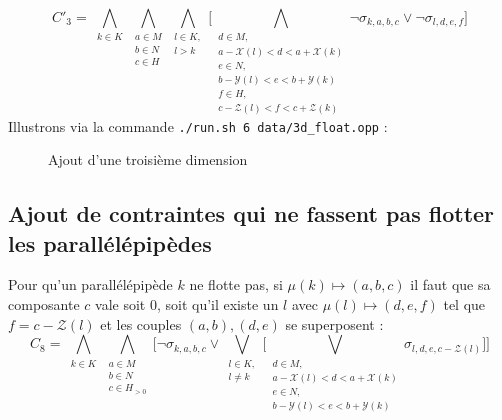 \documentclass[a4paper]{article}
\begin{document}
\begin{equation*}
	C'_3 = 	\bigwedge\limits_{\substack{k\in K}}
			\bigwedge\limits_{\substack{a \in M \\ b \in N \\ c \in H}}
				\bigwedge\limits_{\substack{l\in K,\\ l > k}}
					\bigg[
					\bigwedge\limits_{\substack{d \in M,\\ a-\mathcal{X}(l) < d < a +\mathcal{X}(k) \\  e \in N, \\b-\mathcal{Y}(l) < e < b +\mathcal{Y}(k)\\ f \in H, \\ c-\mathcal{Z}(l) < f < c+\mathcal{Z}(k)}}
						\lnot \sigma_{k,a,b,c} \lor \lnot \sigma_{l,d,e,f}	
					\bigg]
\end{equation*}
Illustrons via la commande \texttt{./run.sh 6 data/3d\_float.opp} : 
\begin{figure}[H]
  \centering
  \caption{Ajout d'une troisième dimension}
\end{figure}

\subsection{Ajout de contraintes qui ne fassent pas flotter les parallélépipèdes}
Pour qu'un parallélépipède $k$ ne flotte pas, si $\mu(k) \mapsto (a,b,c)$ il faut que sa composante $c$ vale soit $0$, soit qu'il existe un $l$ avec $\mu(l) \mapsto (d,e,f)$ tel que $f = c - \mathcal{Z}(l)$ et les couples $(a,b), (d,e)$ se superposent :
\begin{equation*}
C_8  = 	\bigwedge\limits_{\substack{k\in K}}
			\bigwedge\limits_{\substack{a \in M \\ b \in N \\ c \in H_{>0}}}
			\bigg[
				\lnot \sigma_{k,a,b,c} \lor
				\bigvee\limits_{\substack{l\in K, \\ l \neq k}}
				\Big[
					\bigvee\limits_{\substack{d \in M,\\ a-\mathcal{X}(l) < d < a +\mathcal{X}(k) \\  e \in N, \\b-\mathcal{Y}(l) < e < b +\mathcal{Y}(k)}}
						\sigma_{l,d,e,c - \mathcal{Z}(l)}	
				\Big]
			\bigg]
\end{equation*}
\end{document}

